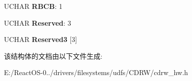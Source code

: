 \begin{DoxyCompactItemize}
\item 
\mbox{\label{struct___r_e_a_l___t_i_m_e___s_t_r_e_a_m_i_n_g___d_e_s_c_r_i_p_t_o_r_af485b39daf6e1c3a57de93191df0f595}} 
U\+C\+H\+AR {\bfseries R\+B\+CB}\+: 1
\item 
\mbox{\label{struct___r_e_a_l___t_i_m_e___s_t_r_e_a_m_i_n_g___d_e_s_c_r_i_p_t_o_r_a47e3df1f1a36f8e1c5a1880bb7a2bc46}} 
U\+C\+H\+AR {\bfseries Reserved}\+: 3
\item 
\mbox{\label{struct___r_e_a_l___t_i_m_e___s_t_r_e_a_m_i_n_g___d_e_s_c_r_i_p_t_o_r_ab0a946b1fecd19bf425fdc8c8a85b674}} 
U\+C\+H\+AR {\bfseries Reserved3} \mbox{[}3\mbox{]}
\end{DoxyCompactItemize}


该结构体的文档由以下文件生成\+:\begin{DoxyCompactItemize}
\item 
E\+:/\+React\+O\+S-\/0../drivers/filesystems/udfs/\+C\+D\+R\+W/cdrw\+\_\+hw.\+h\end{DoxyCompactItemize}
